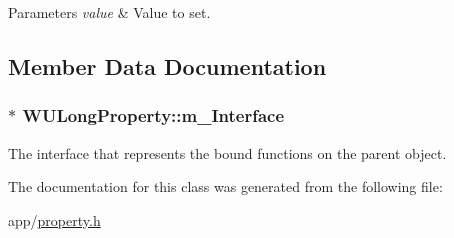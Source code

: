 \begin{DoxyParams}{Parameters}
{\em value} & Value to set. \\
\hline
\end{DoxyParams}


\subsection{Member Data Documentation}
\hypertarget{class_w_u_long_property_ae67a466defe432cdd559c753dc02a5a0}{
\subsubsection[{m\-\_\-\-Interface}]{$\ast$ W\-U\-Long\-Property\-::m\-\_\-\-Interface\hspace{0.3cm}{\ttfamily [protected]}}}\label{class_w_u_long_property_ae67a466defe432cdd559c753dc02a5a0}
The interface that represents the bound functions on the parent object. 

The documentation for this class was generated from the following file\-:\begin{DoxyCompactItemize}
\item 
app/\hyperlink{property_8h}{property.\-h}\end{DoxyCompactItemize}
